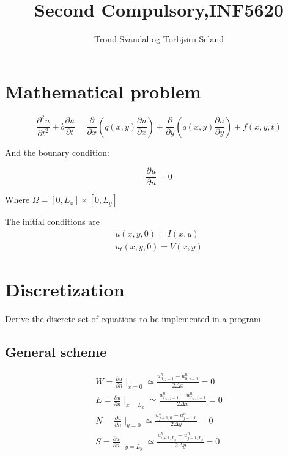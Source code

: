 \documentclass[norsk,11pt,a4paper]{article}
\begin{document}
\title{Second Compulsory,INF5620}
\author{Trond Svandal og Torbjørn Seland}
\maketitle

\section*{Mathematical problem}

\begin{equation}
\frac{\partial^2 u}{\partial t^2} + b \frac{\partial u}{\partial t} = \frac{\partial}{\partial x}\left(q(x,y)\frac{\partial u}{\partial x}\right)+ \frac{\partial}{\partial y}\left(q(x,y)\frac{\partial u}{\partial y}\right)+ f(x,y,t)
\end{equation}

And the bounary condition:

\begin{equation}
\frac{\partial u}{\partial n} = 0
\end{equation}

Where $\Omega = [0,L_x]\times [0,L_y]$


The initial conditions are
\begin{equation}
	\begin{aligned}
	u(x,y,0) = I(x,y) \\
	u_t(x,y,0) = V(x,y)
	\end{aligned}
\end{equation}

\section*{Discretization}
Derive the discrete set of equations to be implemented in a program
\subsection*{General scheme}

\begin{equation}\label{eq:boundary_conditions}
\begin{aligned}
W = \frac{\partial u}{\partial n}\mid_{x=0} \simeq \frac{u^n_{0,j+1}-u^n_{0,j-1}}{2\Delta x} = 0 \\
E = \frac{\partial u}{\partial n}\mid_{x=L_x} \simeq \frac{u^n_{L_x,j+1}-u^n_{L_x,j-1}}{2\Delta x} = 0 \\
N = \frac{\partial u}{\partial n}\mid_{y=0} \simeq \frac{u^n_{j+1,0}-u^n_{j-1,0}}{2\Delta y} = 0 \\
S = \frac{\partial u}{\partial n}\mid_{y=L_y} \simeq \frac{u^n_{i+1,L_y}-u^n_{j-1,L_y}}{2\Delta y} = 0
\end{aligned}
\end{equation}
\end{document}
